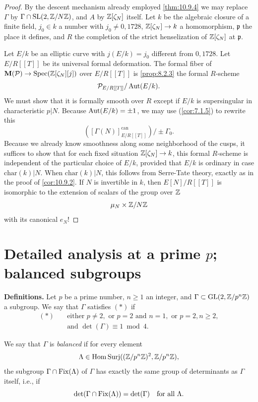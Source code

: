 \begin{proof}
By the descent mechanism already employed \eqref{thm:10.9.4} we may replace $\Gamma$ by $\Gamma \cap \operatorname{SL}(2, \mathbb{Z}/N\mathbb{Z})$, and $A$ by $\mathbb{Z}[\zeta_N]$ itself. Let $k$ be the algebraic closure of a finite field, $j_0 \in k$ a number with $j_0 \ne 0, 1728$, $\mathbb{Z}[\zeta_N] \to k$ a homomorphism, $\mathfrak{p}$ the place it defines, and $R$ the completion of the strict henselization of $\mathbb{Z}[\zeta_N]$ at $\mathfrak{p}$.
\par
Let $E/k$ be an elliptic curve with $j(E/k) = j_0$ different from $0, 1728$. Let $E/R[[T]]$ be its universal formal deformation. The formal fiber of $\mathbf{M}(\mathcal{P}) \to \operatorname{Spec}(\mathbb{Z}[\zeta_N][j])$ over $E/R[[T]]$ is \eqref{prop:8.2.3} the formal $R$-scheme
\[
\mathcal{P}_{E/R[[T]]}/\operatorname{Aut}(E/k) .
\]
We must show that it is formally smooth over $R$ except if $E/k$ is supersingular in characteristic $p|N$. Because $\operatorname{Aut}(E/k) = \pm 1$, we may use (\ref{cor:7.1.5}) to rewrite this
\[
([\Gamma(N)]^{\mathrm{can}}_{E/R[[T]]})/\pm \Gamma_0 .
\]
Because we already know smoothness along some neighborhood of the cusps, it suffices to show that for each fixed situation $\mathbb{Z}[\zeta_N] \to k$, this formal $R$-scheme is independent of the particular choice of $E/k$, provided that $E/k$ is ordinary in case $\mathrm{char}(k)|N$. When $\mathrm{char}(k)|N$, this follows from Serre-Tate theory, exactly as in the proof of \eqref{cor:10.9.2}. If $N$ is invertible in $k$, then $E[N]/R[[T]]$ is isomorphic to the extension of scalars of the group over $\mathbb{Z}$
\[
\mu_N \times \mathbb{Z}/N\mathbb{Z}
\]
with its canonical $e_N$!
\end{proof}

\section{Detailed analysis at a prime $p$; balanced subgroups}
\label{sec:10.10}

\kmitem\label{item:10.10.1}\textbf{Definitions.} Let $p$ be a prime number, $n \ge 1$ an integer, and $\Gamma \subset \operatorname{GL}(2, \mathbb{Z}/p^n\mathbb{Z})$ a subgroup. We say that $\Gamma$ satisfies $(*)$ if
\begin{equation}\label{eq:10.10.1.1}
\begin{aligned}
(*) \quad & \text{either } p \ne 2, \text{ or } p = 2 \text{ and } n = 1, \text{ or } p = 2, n \ge 2, \\
& \text{and } \det(\Gamma) \equiv 1 \bmod 4 .
\end{aligned}
\end{equation}
\par
We say that $\Gamma$ is \emph{balanced} if for every element
\[
\Lambda \in \mathrm{Hom\,Surj}((\mathbb{Z}/p^n\mathbb{Z})^2, \mathbb{Z}/p^n\mathbb{Z}) ,
\]
the subgroup $\Gamma \cap \operatorname{Fix}(\Lambda)$ of $\Gamma$ has exactly the same group of determinants as $\Gamma$ itself, i.e., if
\begin{equation}\label{eq:10.10.1.2}
\det(\Gamma \cap \operatorname{Fix}(\Lambda)) = \det(\Gamma) \quad\text{for all } \Lambda .
\end{equation}

